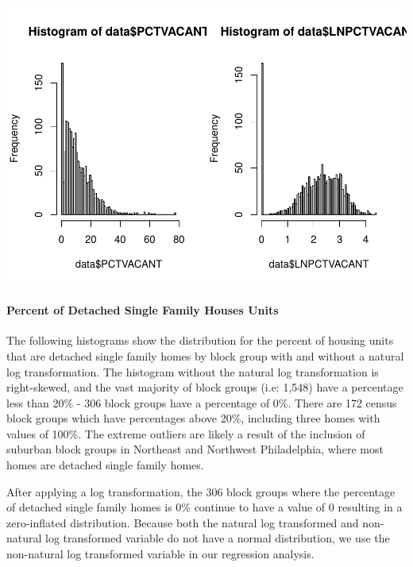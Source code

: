 \documentclass[
]{article}
\begin{document}
\includegraphics{HW1-Regression_files/figure-latex/hist_PCTVACANT-1.pdf}

\hypertarget{percent-of-detached-single-family-houses-units}{%
\paragraph{Percent of Detached Single Family Houses
Units}\label{percent-of-detached-single-family-houses-units}}

The following histograms show the distribution for the percent of
housing units that are detached single family homes by block group with
and without a natural log transformation. The histogram without the
natural log transformation is right-skewed, and the vast majority of
block groups (i.e: 1,548) have a percentage less than 20\% - 306 block
groups have a percentage of 0\%. There are 172 census block groups which
have percentages above 20\%, including three homes with values of 100\%.
The extreme outliers are likely a result of the inclusion of suburban
block groups in Northeast and Northwest Philadelphia, where most homes
are detached single family homes.

After applying a log transformation, the 306 block groups where the
percentage of detached single family homes is 0\% continue to have a
value of 0 resulting in a zero-inflated distribution. Because both the
natural log transformed and non-natural log transformed variable do not
have a normal distribution, we use the non-natural log transformed
variable in our regression analysis.
\end{document}
